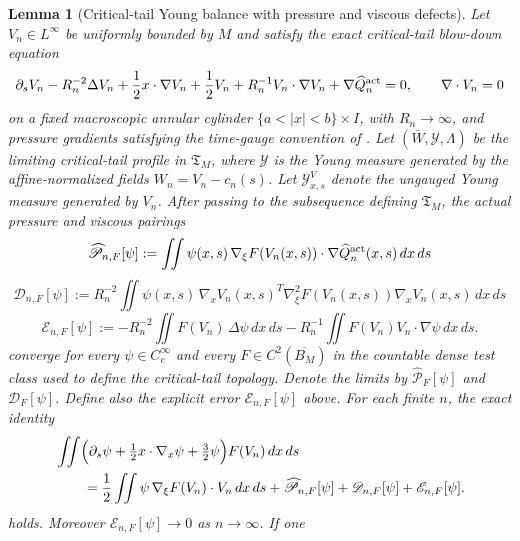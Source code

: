 \documentclass[11pt]{amsart}
\numberwithin{equation}{section}
\theoremstyle{plain}
\newtheorem{lemma}[lemma]{Lemma}
\theoremstyle{definition}
\theoremstyle{remark}
\newcommand{\Tcrit}{\mathfrak T_M}
\begin{document}
\begin{lemma}[Critical-tail Young balance with pressure and viscous defects]
\label{lem:critical-tail-young-log-transport}
Let \(V_n\in L^\infty\) be uniformly bounded by \(M\) and satisfy the exact
critical-tail blow-down equation
\begin{equation}\label{eq:critical-blow-down-equation}
   \partial_s V_n
   -R_n^{-2}\Delta V_n
   +\frac12 x\cdot\nabla V_n+\frac12 V_n
   +R_n^{-1}V_n\cdot\nabla V_n+\nabla \widehat Q_n^{\rm act}=0,
   \qquad \nabla\cdot V_n=0
\end{equation}
on a fixed macroscopic annular cylinder \(\{a<|x|<b\}\times I\), with
\(R_n\to\infty\), and pressure gradients satisfying the time-gauge convention of
.  Let
\((\bar W,\mathcal Y,\Lambda)\) be the limiting critical-tail profile in
\(\Tcrit\), where \(\mathcal Y\) is the Young measure generated by the
affine-normalized fields \(W_n=V_n-c_n(s)\).  Let
\(\mathcal Y^V_{x,s}\) denote the ungauged Young measure generated by \(V_n\).
After passing to the subsequence defining \(\Tcrit\), the actual pressure and
viscous pairings
\[
   \widehat{\mathscr P}_{n,F}[\psi]
   :=
   \iint \psi(x,s)\,
      \nabla_\xi F(V_n(x,s))\cdot
      \nabla\widehat Q_n^{\rm act}(x,s)\,dx\,ds
\]
\[
   \mathscr D_{n,F}[\psi]
   :=
   R_n^{-2}\iint
      \psi(x,s)\,
      \nabla_xV_n(x,s)^T
      \nabla_\xi^2F(V_n(x,s))
      \nabla_xV_n(x,s)\,dx\,ds
\]
\[
   \mathscr E_{n,F}[\psi]
   :=
   -R_n^{-2}\iint F(V_n)\,\Delta\psi\,dx\,ds
   -R_n^{-1}\iint F(V_n)V_n\cdot\nabla\psi\,dx\,ds .
\]
converge for every \(\psi\in C_c^\infty\) and every
\(F\in C^2(\overline{B_M})\) in the countable dense test class used to define
the critical-tail topology.  Denote the limits by
\(\widehat{\mathscr P}_F[\psi]\) and \(\mathscr D_F[\psi]\).  Define also the
explicit error \(\mathscr E_{n,F}[\psi]\) above.  For each finite \(n\), the exact identity
\begin{equation}\label{eq:young-transport-identity-finite-n}
\begin{aligned}
   &\iint
   \Bigl(\partial_s\psi+\tfrac12 x\cdot\nabla_x\psi+\tfrac32\psi\Bigr)
   F(V_n)\,dx\,ds\\
   &\qquad =
   \frac12\iint \psi\,\nabla_\xi F(V_n)\cdot V_n\,dx\,ds
   +\widehat{\mathscr P}_{n,F}[\psi]
   +\mathscr D_{n,F}[\psi]+\mathscr E_{n,F}[\psi].
\end{aligned}
\end{equation}
holds.  Moreover \(\mathscr E_{n,F}[\psi]\to0\) as \(n\to\infty\).  If one

\end{lemma}
\end{document}
